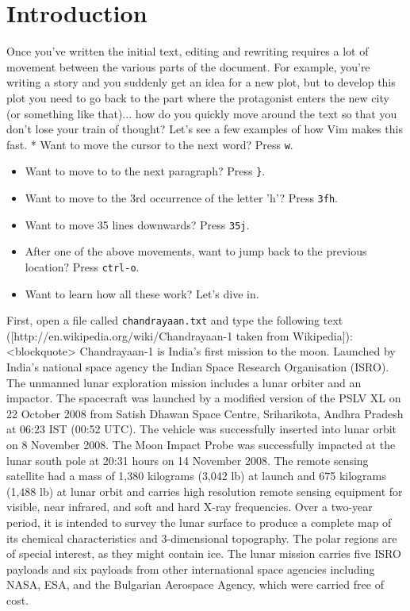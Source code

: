 \section{Introduction} 
Once you've written the initial text, editing and rewriting
requires a lot of movement between the various parts of the document. For
example, you're writing a story and you suddenly get an idea for a new plot,
but to develop this plot you need to go back to the part where the protagonist
enters the new city (or something like that)... how do you quickly move around
the text so that you don't lose your train of thought? Let's see a few examples
of how Vim makes this fast. * Want to move the cursor to the next word? Press
\texttt{w}. 
\begin{itemize}
\item Want to move to to the next paragraph? Press \texttt{\}}. 
\item Want
to move to the 3rd occurrence of the letter 'h'? Press \texttt{3fh}. 
\item Want to
move 35 lines downwards? Press \texttt{35j}. 
\item After one of the above
movements, want to jump back to the previous location? Press \texttt{ctrl-o}. 
\item Want to learn how all these work? Let's dive in. 
\end{itemize}
First, open a file called
\texttt{chandrayaan.txt} and type the following text
([http://en.wikipedia.org/wiki/Chandrayaan-1 taken from Wikipedia]):
<blockquote> Chandrayaan-1 is India's first mission to the moon. Launched by
India's national space agency the Indian Space Research Organisation (ISRO).
The unmanned lunar exploration mission includes a lunar orbiter and an
impactor. The spacecraft was launched by a modified version of the PSLV XL on
22 October 2008 from Satish Dhawan Space Centre, Sriharikota, Andhra Pradesh at
06:23 IST (00:52 UTC). The vehicle was successfully inserted into lunar orbit
on 8 November 2008. The Moon Impact Probe was successfully impacted at the
lunar south pole at 20:31 hours on 14 November 2008. The remote sensing
satellite had a mass of 1,380 kilograms (3,042 lb) at launch and 675 kilograms
(1,488 lb) at lunar orbit and carries high resolution remote sensing equipment
for visible, near infrared, and soft and hard X-ray frequencies. Over a
two-year period, it is intended to survey the lunar surface to produce a
complete map of its chemical characteristics and 3-dimensional topography. The
polar regions are of special interest, as they might contain ice. The lunar
mission carries five ISRO payloads and six payloads from other international
space agencies including NASA, ESA, and the Bulgarian Aerospace Agency, which
were carried free of cost.

